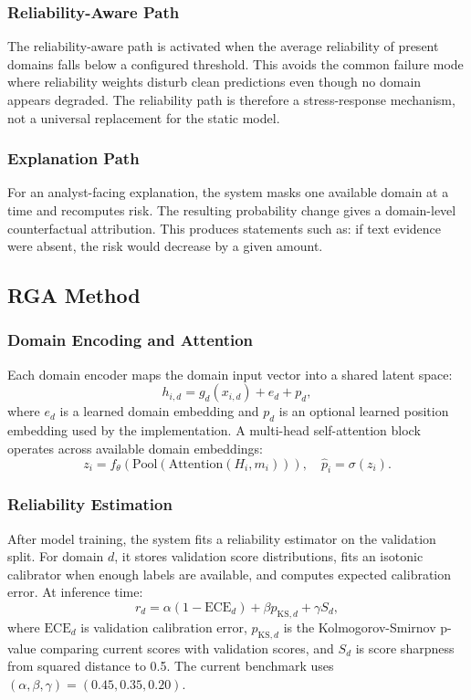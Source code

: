 \documentclass[10pt,conference]{IEEEtran}
\newcommand{\method}{RGA}
\begin{document}
\subsubsection{Reliability-Aware Path}
The reliability-aware path is activated when the average reliability of present
domains falls below a configured threshold. This avoids the common failure mode
where reliability weights disturb clean predictions even though no domain
appears degraded. The reliability path is therefore a stress-response mechanism,
not a universal replacement for the static model.

\subsubsection{Explanation Path}
For an analyst-facing explanation, the system masks one available domain at a
time and recomputes risk. The resulting probability change gives a domain-level
counterfactual attribution. This produces statements such as: if text evidence
were absent, the risk would decrease by a given amount.

\subsection{\method{} Method}
\subsubsection{Domain Encoding and Attention}
Each domain encoder maps the domain input vector into a shared latent space:
\begin{equation}
  h_{i,d} = g_d(x_{i,d}) + e_d + p_d,
\end{equation}
where $e_d$ is a learned domain embedding and $p_d$ is an optional learned
position embedding used by the implementation. A multi-head self-attention
block operates across available domain embeddings:
\begin{equation}
  z_i = f_{\theta}(\mathrm{Pool}(\mathrm{Attention}(H_i,m_i))),
  \quad
  \hat{p}_i = \sigma(z_i).
\end{equation}

\subsubsection{Reliability Estimation}
After model training, the system fits a reliability estimator on the validation
split. For domain $d$, it stores validation score distributions, fits an
isotonic calibrator when enough labels are available, and computes expected
calibration error. At inference time:
\begin{equation}
  r_d =
  \alpha(1-\mathrm{ECE}_d)
  + \beta p_{\mathrm{KS},d}
  + \gamma S_d,
  \label{eq:reliability}
\end{equation}
where $\mathrm{ECE}_d$ is validation calibration error,
$p_{\mathrm{KS},d}$ is the Kolmogorov-Smirnov p-value comparing current scores
with validation scores, and $S_d$ is score sharpness from squared distance to
0.5. The current benchmark uses $(\alpha,\beta,\gamma)=(0.45,0.35,0.20)$.
\end{document}

